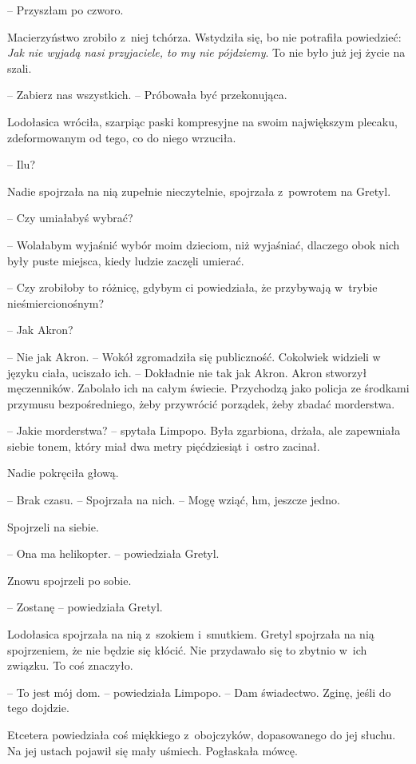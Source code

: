 \documentclass[oneside,polish,11pt,sfheadings]{mwbk}
\begin{document}
-- Przyszłam po czworo.

Macierzyństwo zrobiło z~niej tchórza. Wstydziła się, bo nie potrafiła
powiedzieć: \textit{Jak nie wyjadą nasi przyjaciele, to my nie pójdziemy}.
To nie było już jej życie na szali.

-- Zabierz nas wszystkich. -- Próbowała być przekonująca.

Lodołasica wróciła, szarpiąc paski kompresyjne na swoim największym
plecaku, zdeformowanym od tego, co do niego wrzuciła.

-- Ilu?

Nadie spojrzała na nią zupełnie nieczytelnie, spojrzała z~powrotem na
Gretyl. 

-- Czy umiałabyś wybrać?

-- Wolałabym wyjaśnić wybór moim dzieciom, niż wyjaśniać, dlaczego obok
nich były puste miejsca, kiedy ludzie zaczęli umierać.

-- Czy zrobiłoby to różnicę, gdybym ci powiedziała, że przybywają w~trybie nieśmiercionośnym?

-- Jak Akron?

-- Nie jak Akron. -- Wokół zgromadziła się publiczność. Cokolwiek widzieli
w języku ciała, uciszało ich. -- Dokładnie nie tak jak Akron. Akron
stworzył męczenników. Zabolało ich na całym świecie. Przychodzą jako
policja ze środkami przymusu bezpośredniego, żeby przywrócić porządek,
żeby zbadać morderstwa.

-- Jakie morderstwa? -- spytała Limpopo. Była zgarbiona, drżała, ale
zapewniała siebie tonem, który miał dwa metry pięćdziesiąt i~ostro
zacinał.

Nadie pokręciła głową. 

-- Brak czasu. -- Spojrzała na nich. -- Mogę wziąć,
hm, jeszcze jedno.

Spojrzeli na siebie. 

-- Ona ma helikopter. -- powiedziała Gretyl.

Znowu spojrzeli po sobie.

-- Zostanę -- powiedziała Gretyl. 

Lodołasica spojrzała na nią z~szokiem i~smutkiem. Gretyl spojrzała na nią spojrzeniem, że nie będzie się kłócić.
Nie przydawało się to zbytnio w~ich związku. To coś znaczyło.

-- To jest mój dom. -- powiedziała Limpopo. -- Dam świadectwo. Zginę, jeśli
do tego dojdzie.

Etcetera powiedziała coś miękkiego z~obojczyków, dopasowanego do jej
słuchu. Na jej ustach pojawił się mały uśmiech. Pogłaskała mówcę.
\end{document}
